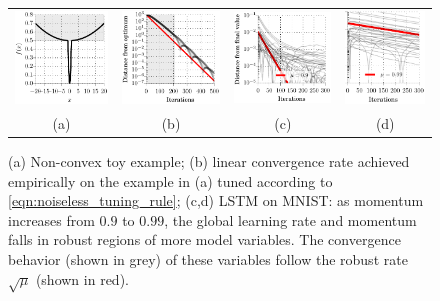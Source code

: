 \documentclass{article}
\begin{document}
\begin{figure}[t]
\centering
\vspace{-0.5em}
\begin{tabular}{c c c c}
  \includegraphics[width=0.225\linewidth]{figures/non_convex_toy} &
  \includegraphics[width=0.235\linewidth]{figures/non_convex_constant_rate} &
  \includegraphics[width=0.235\linewidth]{figures/constant_rate_09} &
  \includegraphics[width=0.185\linewidth]{figures/constant_rate_099} \\
  (a) & (b) & (c) &(d)
\end{tabular}
\vspace{-0.5em}
\caption{(a) Non-convex toy example;
(b) linear convergence rate achieved empirically on the example in (a) tuned according to \eqref{eqn:noiseless_tuning_rule};
(c,d)
LSTM on MNIST: as momentum increases from $0.9$ to $0.99$, the global learning rate and momentum falls in robust regions of more model variables. The convergence behavior (shown in grey) of these variables follow the robust rate $\sqrt{\mu}$ (shown in red).}
\vspace{-0.25em}
\label{fig:curvature_robustness}
\end{figure}
\end{document}
